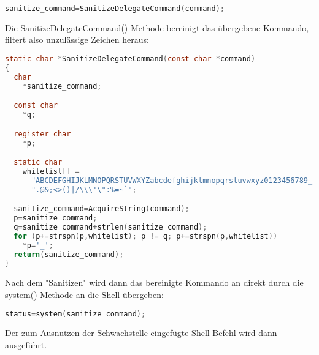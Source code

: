\begin{lstlisting}[firstnumber=395, language=C, caption=magick/delegate.c Aufruf SanitizeDelegateCommand(),label={lst:lstlisting}]
  sanitize_command=SanitizeDelegateCommand(command);
\end{lstlisting}
\vspace{5mm}

Die SanitizeDelegateCommand()-Methode bereinigt das übergebene Kommando, filtert also unzulässige Zeichen heraus:\\

\begin{lstlisting}[firstnumber=322, language=C, caption=magick/delegate.c SanitizieDelegateCommand(),label={lst:lstlisting}]
static char *SanitizeDelegateCommand(const char *command)
{
  char
    *sanitize_command;

  const char
    *q;

  register char
    *p;

  static char
    whitelist[] =
      "ABCDEFGHIJKLMNOPQRSTUVWXYZabcdefghijklmnopqrstuvwxyz0123456789_- "
      ".@&;<>()|/\\\'\":%=~`";

  sanitize_command=AcquireString(command);
  p=sanitize_command;
  q=sanitize_command+strlen(sanitize_command);
  for (p+=strspn(p,whitelist); p != q; p+=strspn(p,whitelist))
    *p='_';
  return(sanitize_command);
}
\end{lstlisting}
\vspace{5mm}

Nach dem "Sanitizen" wird dann das bereinigte Kommando an direkt durch die system()-Methode an die Shell übergeben:\\

\begin{lstlisting}[firstnumber=402, language=C, caption=magick/delegate.c Aufruf system(),label={lst:lstlisting}]
  status=system(sanitize_command);
\end{lstlisting}
\vspace{5mm}

Der zum Ausnutzen der Schwachstelle eingefügte Shell-Befehl wird dann ausgeführt.